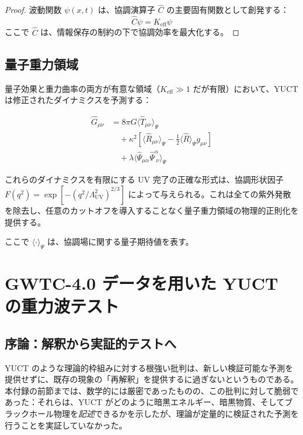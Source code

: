 \documentclass[11pt,a4paper]{article}
\theoremstyle{remark}
\newcommand{\Keff}{K_{\mathrm{eff}}}
\begin{document}
	\begin{proof}
		波動関数 $\psi(x,t)$ は、協調演算子 $\hat{C}$ の主要固有関数として創発する：
		\[
		\hat{C} \psi = \Keff \psi
		\]
		ここで $\hat{C}$ は、情報保存の制約の下で協調効率を最大化する。
	\end{proof}
	
	\subsection{量子重力領域}
	
	量子効果と重力曲率の両方が有意な領域（$\Keff \gg 1$ だが有限）において、YUCT は修正されたダイナミクスを予測する：
	
	\begin{equation}
		\begin{aligned}
			\hat{G}_{\mu\nu} &= 8\pi G \langle \hat{T}_{\mu\nu} \rangle_{\Psi} \\
			&\quad + \kappa^2 \left[ \langle \hat{R}_{\mu\nu} \rangle_{\Psi} - \frac{1}{2} \langle \hat{R} \rangle_{\Psi} g_{\mu\nu} \right] \\
			&\quad + \lambda \langle \hat{\Psi}_{\mu\alpha} \hat{\Psi}^{\alpha}_{\;\nu} \rangle_{\Psi}
		\end{aligned}
	\end{equation}
	
	これらのダイナミクスを有限にする UV 完了の正確な形式は、協調形状因子 $F(q^2)=\exp[-(q^2/\Lambda_{\mathrm{UV}}^2)^{2/3}]$ によって与えられる。これは全ての紫外発散を除去し、任意のカットオフを導入することなく量子重力領域の物理的正則化を提供する。
	
	ここで $\langle \cdot \rangle_{\Psi}$ は、協調場に関する量子期待値を表す。
	
	\section{GWTC-4.0 データを用いた YUCT の重力波テスト}
	\label{sec:gw-tests}
	
	\subsection{序論：解釈から実証的テストへ}
	
	YUCT のような理論的枠組みに対する根強い批判は、新しい検証可能な予測を提供せずに、既存の現象の「再解釈」を提供するに過ぎないというものである。本付録の前節までは、数学的には厳密であったものの、この批判に対して脆弱であった：それらは、YUCT がどのように暗黒エネルギー、暗黒物質、そしてブラックホール物理を\textit{記述}できるかを示したが、理論が定量的に検証された予測を行うことを実証していなかった。
	
\end{document}
